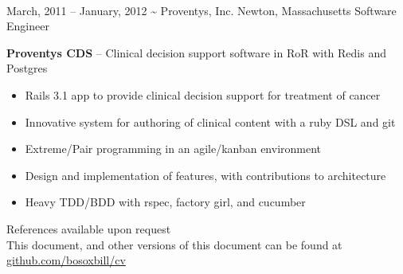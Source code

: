 \documentclass[print]{friggeri-cv}
\begin{document}
\begin{entrylist}
    \\[1cm]%
    \entryalt
    {March, 2011 -- January, 2012}
    {\textbf{\textasciitilde} Proventys, Inc.}
    {Newton, Massachusetts}
    {Software Engineer}
    {\textbf{Proventys CDS} -- Clinical decision support software in RoR with Redis and Postgres
    \begin{itemize}
      \item Rails 3.1 app to provide clinical decision support for treatment of cancer
      \item Innovative system for authoring of clinical content with a ruby DSL and git
      \item Extreme/Pair programming in an agile/kanban environment
      \item Design and implementation of features, with contributions to architecture
      \item Heavy TDD/BDD with rspec, factory girl, and cucumber
    \end{itemize}}
\end{entrylist} 

\vspace*{\fill}
References available upon request\\
This document, and other versions of this document can be found at \href{http://github.com/bosoxbill/cv/}{github.com/bosoxbill/cv}
\end{document}
